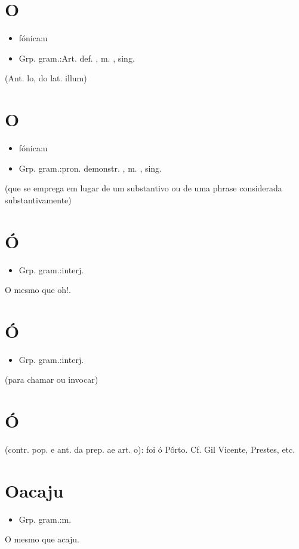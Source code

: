 \section{O}
\begin{itemize}
\item {fónica:u}
\end{itemize}
\begin{itemize}
\item {Grp. gram.:Art. def. ,  m. ,  sing.}
\end{itemize}
(Ant. \textunderscore lo\textunderscore , do lat. \textunderscore illum\textunderscore )
\section{O}
\begin{itemize}
\item {fónica:u}
\end{itemize}
\begin{itemize}
\item {Grp. gram.:pron. demonstr. ,  m. ,  sing.}
\end{itemize}
(que se emprega em lugar de um substantivo ou de uma phrase considerada substantivamente)
\section{Ó}
\begin{itemize}
\item {Grp. gram.:interj.}
\end{itemize}
O mesmo que \textunderscore oh!\textunderscore .
\section{Ó}
\begin{itemize}
\item {Grp. gram.:interj.}
\end{itemize}
(para chamar ou invocar)
\section{Ó}
(contr. pop. e ant. da prep. \textunderscore a\textunderscore  e art. \textunderscore o\textunderscore ): \textunderscore foi ó Pôrto\textunderscore . Cf. Gil Vicente, Prestes, etc.
\section{Oacaju}
\begin{itemize}
\item {Grp. gram.:m.}
\end{itemize}
O mesmo que \textunderscore acaju\textunderscore .
